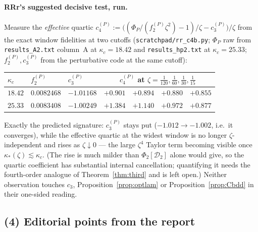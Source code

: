 \documentclass[11pt]{article}
\begin{document}
\paragraph{RRr's suggested decisive test, run.}  Measure the \emph{effective} quartic
$c_4^{(P)}:=\bigl((\Phi_P/(f_2^{(P)}\zeta^2)-1)/\zeta-c_3^{(P)}\bigr)/\zeta$ from the exact window
fidelities at two cutoffs (\texttt{scratchpad/rr\_c4b.py}; $\Phi_P$ raw from
\texttt{results\_A2.txt} column~A at $\kappa_c=18.42$ and \texttt{results\_hp2.txt} at
$\kappa_c=25.33$; $f_2^{(P)},c_3^{(P)}$ from the perturbative code at the same cutoff):
\begin{center}\small
\begin{tabular}{lllrrrr}\toprule
$\kappa_c$ & $f_2^{(P)}$ & $c_3^{(P)}$ & \multicolumn{4}{c}{$c_4^{(P)}$ at
 $\zeta=\frac1{120},\frac1{60},\frac1{30},\frac1{15}$}\\\midrule
$18.42$ & $0.0082468$ & $-1.01168$ & $+0.901$ & $+0.894$ & $+0.880$ & $+0.855$\\
$25.33$ & $0.0083408$ & $-1.00249$ & $+1.384$ & $+1.140$ & $+0.972$ & $+0.877$\\
\bottomrule\end{tabular}\end{center}
Exactly the predicted signature: $c_3^{(P)}$ stays put ($-1.012\to-1.002$, i.e.\ it converges),
while the effective quartic at the widest window is no longer $\zeta$-independent and rises as
$\zeta\downarrow0$ --- the large $\zeta^4$ Taylor term becoming visible once
$\kappa_*(\zeta)\lesssim\kappa_c$.  (The rise is much milder than $\Phi_2[\mathcal D_2]$ alone would
give, so the quartic coefficient has substantial internal cancellation; quantifying it needs the
fourth-order analogue of Theorem~\ref{thm:third} and is left open.)  Neither observation touches
$c_3$, Proposition~\ref{prop:optlam} or Proposition~\ref{prop:Cbdd} in their one-sided reading.

\subsection{(4) Editorial points from the report}
\end{document}
